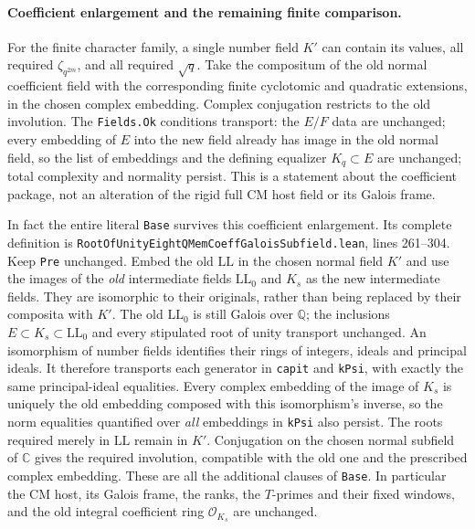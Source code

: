 \documentclass[11pt]{article}
\newcommand{\Q}{\mathbb Q}\newcommand{\C}{\mathbb C}\newcommand{\Z}{\mathbb Z}\newcommand{\R}{\mathbb R}\newcommand{\A}{\mathbb A}\newcommand{\OO}{\mathcal O}
\theoremstyle{definition}\newtheorem{definition}[theorem]{Definition}\newtheorem{remark}[theorem]{Remark}
\begin{document}
\paragraph{Coefficient enlargement and the remaining finite comparison.}
For the finite character family, a single number field
$K'$ can contain its values, all required
$\zeta_{q^{2m}}$, and all required $\sqrt q$.
Take the compositum of the old normal coefficient field
with the corresponding finite cyclotomic and quadratic
extensions, in the chosen complex embedding.  Complex
conjugation restricts to the old involution.  The
\texttt{Fields.Ok} conditions transport: the $E/F$ data
are unchanged; every embedding of $E$ into the new field
already has image in the old normal field, so the list
of embeddings and the defining equalizer $K_q\subset E$
are unchanged; total complexity and normality persist.
This is a statement about the coefficient package, not
an alteration of the rigid full CM host field or its
Galois frame.

In fact the entire literal \texttt{Base} survives this
coefficient enlargement.  Its complete definition is
\nolinkurl{RootOfUnityEightQMemCoeffGaloisSubfield.lean},
lines 261--304.  Keep \texttt{Pre} unchanged.  Embed the
old $\mathrm{LL}$ in the chosen normal field $K'$ and
use the images of the \emph{old} intermediate fields
$\mathrm{LL}_0$ and $K_s$ as the new intermediate fields.
They are isomorphic to their originals, rather than
being replaced by their composita with $K'$.
The old $\mathrm{LL}_0$ is still Galois over $\Q$;
the inclusions $E\subset K_s\subset\mathrm{LL}_0$
and every stipulated root of unity transport unchanged.
An isomorphism of number fields identifies their rings
of integers, ideals and principal ideals.  It therefore
transports each generator in \texttt{capit} and
\texttt{kPsi}, with exactly the same principal-ideal
equalities.  Every complex embedding of the image of
$K_s$ is uniquely the old embedding composed with this
isomorphism's inverse, so the norm equalities quantified
over \emph{all} embeddings in \texttt{kPsi} also persist.
The roots required merely in $\mathrm{LL}$ remain in
$K'$.  Conjugation on the chosen normal subfield of
$\C$ gives the required involution, compatible with
the old one and the prescribed complex embedding.
These are all the additional clauses of \texttt{Base}.
In particular the CM host, its Galois frame, the ranks,
the $T$-primes and their fixed windows, and the old
integral coefficient ring $\OO_{K_s}$ are unchanged.
\end{document}
